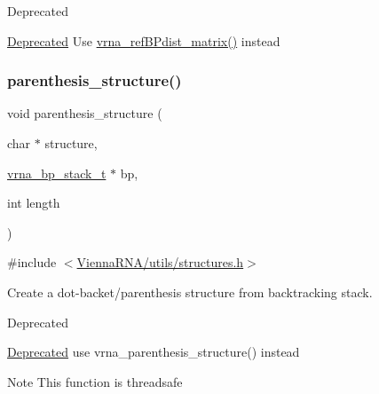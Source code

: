 \begin{DoxyRefDesc}{Deprecated}
\item[\mbox{\hyperlink{deprecated__deprecated000206}{Deprecated}}]Use \mbox{\hyperlink{group__struct__utils_ga5a27bd058183170afd4716f5b8ff511a}{vrna\+\_\+ref\+B\+Pdist\+\_\+matrix()}} instead\end{DoxyRefDesc}
\mbox{\label{group__struct__utils__deprecated_gadf0ad2d46c9ca7b850437d1b79627a7e}} 
\subsubsection{\texorpdfstring{parenthesis\_structure()}{parenthesis\_structure()}}
{\footnotesize\ttfamily void parenthesis\+\_\+structure (\begin{DoxyParamCaption}\item[{char $\ast$}]{structure,  }\item[{\mbox{\hyperlink{group__data__structures_gaa651bda42e7692f08cb603cd6834b0ee}{vrna\+\_\+bp\+\_\+stack\+\_\+t}} $\ast$}]{bp,  }\item[{int}]{length }\end{DoxyParamCaption})}



{\ttfamily \#include $<$\mbox{\hyperlink{utils_2structures_8h}{Vienna\+R\+N\+A/utils/structures.\+h}}$>$}



Create a dot-\/backet/parenthesis structure from backtracking stack. 

\begin{DoxyRefDesc}{Deprecated}
\item[\mbox{\hyperlink{deprecated__deprecated000208}{Deprecated}}]use vrna\+\_\+parenthesis\+\_\+structure() instead\end{DoxyRefDesc}
\begin{DoxyNote}{Note}
This function is threadsafe 
\end{DoxyNote}
\mbox{\label{group__struct__utils__deprecated_gab9c5c8311bd5120900585d4fa50c2df0}} 
